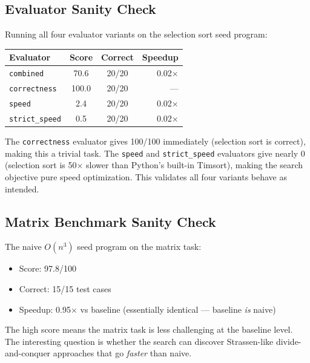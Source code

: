 \documentclass[11pt,a4paper]{article}
\begin{document}
\subsection{Evaluator Sanity Check}

Running all four evaluator variants on the selection sort seed program:

\begin{center}
\begin{tabular}{lccr}
\toprule
\textbf{Evaluator} & \textbf{Score} & \textbf{Correct} & \textbf{Speedup} \\
\midrule
\texttt{combined}     & 70.6 & 20/20 & 0.02$\times$ \\
\texttt{correctness}  & 100.0 & 20/20 & --- \\
\texttt{speed}        & 2.4  & 20/20 & 0.02$\times$ \\
\texttt{strict\_speed} & 0.5  & 20/20 & 0.02$\times$ \\
\bottomrule
\end{tabular}
\end{center}

The \texttt{correctness} evaluator gives 100/100 immediately (selection sort
is correct), making this a trivial task. The \texttt{speed} and
\texttt{strict\_speed} evaluators give nearly 0 (selection sort is 50$\times$
slower than Python's built-in Timsort), making the search objective pure
speed optimization. This validates all four variants behave as intended.

\subsection{Matrix Benchmark Sanity Check}

The naive $O(n^3)$ seed program on the matrix task:
\begin{itemize}
  \item Score: 97.8/100
  \item Correct: 15/15 test cases
  \item Speedup: 0.95$\times$ vs baseline (essentially identical --- baseline \emph{is} naive)
\end{itemize}

The high score means the matrix task is less challenging at the baseline level.
The interesting question is whether the search can discover Strassen-like
divide-and-conquer approaches that go \emph{faster} than naive.

\end{document}
